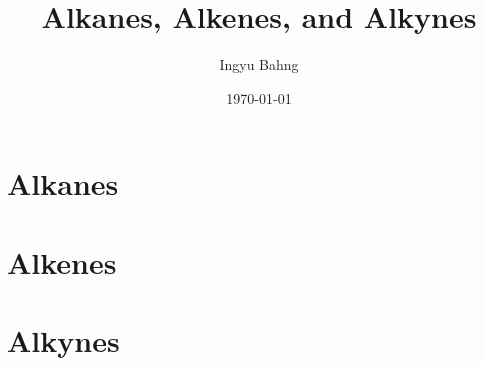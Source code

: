 \documentclass[10pt]{article}
\title{Alkanes, Alkenes, and Alkynes}
\date{\today}
\author{Ingyu Bahng}
\begin{document}


\section{Alkanes}

\section{Alkenes}

\section{Alkynes}
  
\end{document}
